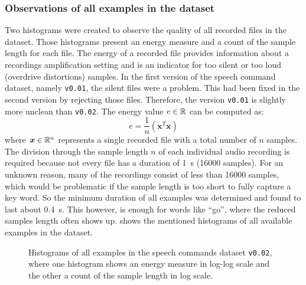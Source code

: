 \subsubsection{Observations of all examples in the dataset}
Two histograms were created to observe the quality of all recorded files in the dataset.
Those histograms present an energy measure and a count of the sample length for each file.
The energy of a recorded file provides information about a recordings amplification setting and is an indicator for too silent or too loud (overdrive distortions) samples.
In the first version of the speech command dataset, namely \texttt{v0.01}, the silent files were a problem.
This had been fixed in the second version by rejecting those files.
Therefore, the version \texttt{v0.01} is slightly more unclean than \texttt{v0.02}.
The energy value $e \in \mathbb{R}$ can be computed as:
\begin{equation}\label{eq:exp_dataset_energy}
  e = \frac{1}{n} \left( \bm{x}^T \bm{x} \right)
\end{equation}
where $\bm{x} \in \mathbb{R}^n$ represents a single recorded file with a total number of $n$ samples.
The division through the sample length $n$ of each individual audio recording is required because not every file has a duration of \SI{1}{\second} (16000 samples).
For an unknown reason, many of the recordings consist of less than 16000 samples, which would be problematic if the sample length is too short to fully capture a key word.
So the minimum duration of all examples was determined and found to last about \SI{0.4}{\second}.
This however, is enough for words like \enquote{go}, where the reduced samples length often shows up.
 shows the mentioned histograms of all available examples in the dataset.
\begin{figure}[!ht]
  \centering
    \qquad
  \caption{Histograms of all examples in the speech commands dataset \texttt{v0.02}, where one histogram shows an energy measure in log-log scale and the other a count of the sample length in log scale.}
  \label{fig:exp_dataset_hist}
\end{figure}
